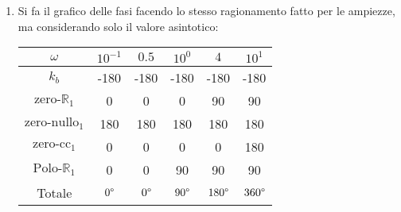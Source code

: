 \documentclass[a4paper]{article}
\begin{document}
\begin{example}
\begin{enumerate}
    \item Si fa il grafico delle fasi facendo lo stesso ragionamento fatto per le ampiezze,
      ma considerando solo il valore asintotico:
      \begin{table}[H]
        \centering
        \begin{tabular}{c|c|c|c|c|c}
          $\omega$ & $10^{-1}$ & $0.5$ & $10^{0}$ & $4$ & $10^{1}$\\
          \hline
          \color{blue} \( k_b  \) & \color{blue}-180 & \color{blue}-180 & \color{blue}-180 & \color{blue}-180 & \color{blue}-180 \\
          \color{red} \( \text{zero-}\mathbb{R}_1 \)
                                    & \color{red}0 & \color{red}0 & \color{red}0 & \color{red}90 & \color{red}90 \\ 
          \color{green!50!black} \( \text{zero-nullo}_1 \)
                                    & \color{green!50!black}180 & \color{green!50!black}180 & \color{green!50!black}180 & \color{green!50!black}180 & \color{green!50!black}180 \\ 
          \color{purple} \( \text{zero-cc}_1 \)
                                    & \color{purple}0 & \color{purple}0 & \color{purple}0 & \color{purple}0 & \color{purple}180 \\ 
          \color{orange} \( \text{Polo-}\mathbb{R}_1 \) 
                                    & \color{orange}0 & \color{orange}0 & \color{orange}90 & \color{orange}90 & \color{orange}90 \\ 
          \hline
          Totale  & $0\degree$ & $0\degree$ & $90\degree$ & $180\degree$ & $360\degree$
        \end{tabular}
      \end{table}
      \label{16-12-D3}
      
  \end{enumerate}

\end{example}
\end{document}
